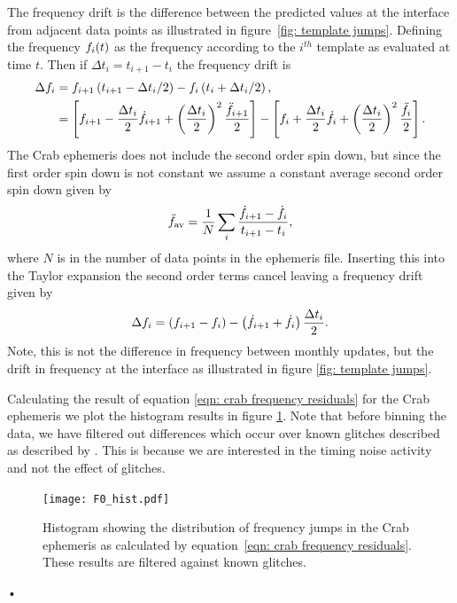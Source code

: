 \documentclass[../full_thesis/full_thesis.tex]{subfiles}
\begin{document}
The frequency drift is the difference between the predicted values at the
interface from adjacent data points as illustrated in figure~\ref{fig: template
jumps}.  Defining the frequency $f_{i}(t)$ as the frequency according to the
$i^{th}$ template as evaluated at time $t$. Then if $\Delta t_{i} = t_{i+1} -
t_{i}$ the frequency drift is 
\begin{align}
\Delta f_{i} &= f_{i+1}\left(t_{i+1}-\Delta t_{i}/2\right) -  f_{i}\left(t_{i}+\Delta t_{i}/2\right), \\ 
    &= \left[f_{i+1}- \frac{\Delta t_{i}}{2}\dot{f}_{i+1} + \left(\frac{\Delta t_{i}}{2}\right)^{2}\frac{\ddot{f}_{i+1}}{2}\right] 
     - \left[f_{i} + \frac{\Delta t_{i}}{2}\dot{f}_{i}+ \left(\frac{\Delta t_{i}}{2}\right)^{2}\frac{\ddot{f}_{i}}{2}\right] .
\end{align}
The Crab ephemeris does not include the second order spin down, but since the
first order spin down is not constant we assume a constant average second order
spin down given by 
\newcommand{\fddotav}{\ddot{\f}_{\textrm{av}}}
\begin{equation}
   \fddotav = \frac{1}{N}\sum_{i} \frac{\dot{\f}_{i+1} - \dot{\f_{i}}}{t_{i+1} - t_{i}},
   \label{eqn: average second order spin down}
\end{equation}
where $N$ is in the number of data points in the ephemeris file. Inserting this
into the Taylor expansion the second order terms cancel leaving a frequency
drift given by
\begin{equation}
\Delta f_{i} = \left(f_{i+1}- f_{i}\right) -  \left(\dot{f}_{i+1} 
               + \dot{f}_{i}\right)\frac{\Delta t_{i}}{2}.
\label{eqn: crab frequency residuals}
\end{equation}
Note, this is not the difference in frequency between monthly
updates, but the drift in frequency at the interface as illustrated in figure
\ref{fig: template jumps}. 

Calculating the result of equation \eqref{eqn: crab frequency residuals} for
the Crab ephemeris we plot the histogram results in figure \ref{fig: F0_hist}.
Note that before binning the data, we have filtered out differences which
occur over known glitches described as described by \citet{Espinoza2011}. This
is because we are interested in the timing noise activity and not the effect
of glitches.

\begin{figure}[ht]
\centering
\texttt{[image: F0\_hist.pdf]}
\caption{Histogram showing the distribution of frequency jumps in the Crab 
        ephemeris as calculated by 
        equation~\eqref{eqn: crab frequency residuals}. These results are filtered
    against known glitches.}
\label{fig: F0_hist}
\end{figure}•
\end{document}
